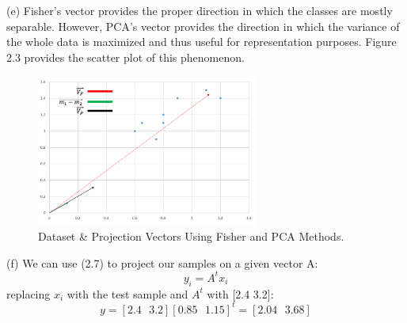 \documentclass[12pt]{article}
\numberwithin{equation}{section}
\numberwithin{table}{section}
\numberwithin{figure}{section}
\begin{document}
(e) Fisher's vector provides the proper direction in which the classes are mostly separable. However, PCA's vector provides the direction in which the variance of the whole data is maximized and thus useful for representation purposes. Figure 2.3 provides the scatter plot of this phenomenon.
		\begin{figure}[!h]\centering
	\includegraphics[width=0.65\textwidth]{2_e.PNG}
	\caption{Dataset \& Projection Vectors Using Fisher and PCA Methods.}
	\label{pl1}
\end{figure}

(f) We can use (2.7) to project our samples on a given vector A:
\begin{equation}
	y_i = A^t x_i
\end{equation}
replacing $x_i$ with the test sample and $A^t$ with [2.4 3.2]:
$$
	y = [2.4 \ \ \ 3.2][0.85\ \ \ 1.15]^t = [2.04 \ \ \ 3.68]
$$
\end{document}
